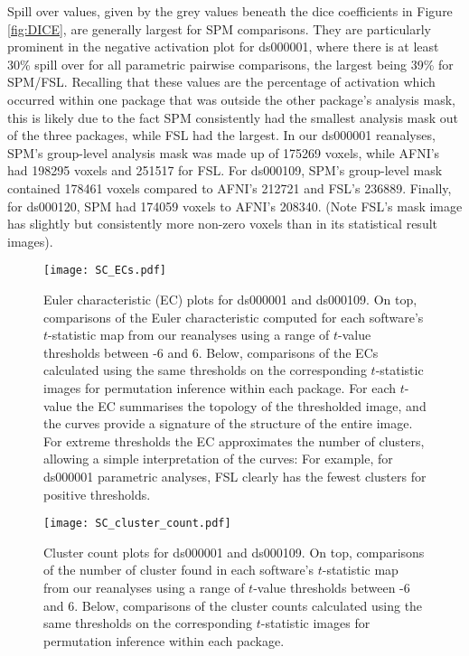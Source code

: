 Spill over values, given by the grey values beneath the dice coefficients in Figure \ref{fig:DICE}, are generally largest for SPM comparisons. They are particularly prominent in the negative activation plot for ds000001, where there is at least 30\% spill over for all parametric pairwise comparisons, the largest being 39\% for SPM/FSL. Recalling that these values are the percentage of activation which occurred within one package that was outside the other package's analysis mask, this is likely due to the fact SPM consistently had the smallest analysis mask out of the three packages, while FSL had the largest. In our ds000001 reanalyses, SPM's group-level analysis mask was made up of 175269 voxels, while AFNI's had 198295 voxels and 251517 for FSL.  For ds000109, SPM's group-level mask contained 178461 voxels compared to AFNI's 212721 and FSL's 236889. Finally, for ds000120, SPM had 174059 voxels to AFNI's 208340. (Note FSL's mask image has slightly but consistently more non-zero voxels than in its statistical result images).

\begin{sidewaysfigure}[htbp]
\centering
	\texttt{[image: SC\_ECs.pdf]}	
\caption{Euler characteristic (EC) plots for ds000001 and ds000109. On top, comparisons of the Euler characteristic computed for each software's $t$-statistic map from our reanalyses using a range of $t$-value thresholds between -6 and 6. Below, comparisons of the ECs calculated using the same thresholds on the corresponding $t$-statistic images for permutation inference within each package. For each $t$-value the EC summarises the topology of the thresholded image, and the curves provide a signature of the structure of the entire image. For extreme thresholds the EC approximates the number of clusters, allowing a simple interpretation of the curves: For example, for ds000001 parametric analyses, FSL clearly has the fewest clusters for positive thresholds.}
\label{fig:ECs}
\end{sidewaysfigure}

\begin{sidewaysfigure}[htbp]
\centering
	\texttt{[image: SC\_cluster\_count.pdf]}	
\caption{Cluster count plots for ds000001 and ds000109. On top, comparisons of the number of cluster found in each software's $t$-statistic map from our reanalyses using a range of $t$-value thresholds between -6 and 6. Below, comparisons of the cluster counts calculated using the same thresholds on the corresponding $t$-statistic images for permutation inference within each package.}
\label{fig:cluster_count}
\end{sidewaysfigure}

